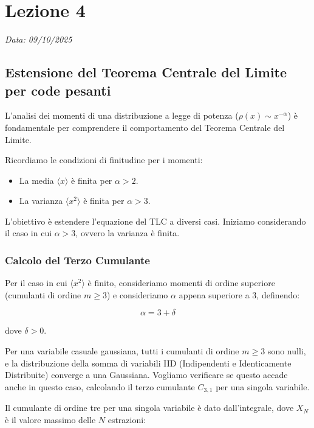 \chapter{Lezione 4}
\label{chap:lezione_04} 

\begin{flushright}
\textit{Data: 09/10/2025}
\end{flushright}


\section{Estensione del Teorema Centrale del Limite per code pesanti }

L'analisi dei momenti di una distribuzione a legge di potenza ($\rho(x) \sim x^{-\alpha}$) è fondamentale per comprendere il comportamento del Teorema Centrale del Limite.

Ricordiamo le condizioni di finitudine per i momenti:
\begin{itemize}
    \item La media $\langle x \rangle$ è finita per $\alpha > 2$.
    \item La varianza $\langle x^2 \rangle$ è finita per $\alpha > 3$.
\end{itemize}

L'obiettivo è estendere l'equazione del TLC a diversi casi. Iniziamo considerando il caso in cui $\alpha > 3$, ovvero la varianza è finita.

\subsection{Calcolo del Terzo Cumulante}

Per il caso in cui $\langle x^2 \rangle$ è finito, consideriamo momenti di ordine superiore (cumulanti di ordine $m \ge 3$) e consideriamo $\alpha$ appena superiore a 3, definendo:

\begin{equation}
\alpha = 3 + \delta
\end{equation}

dove $\delta > 0$.

Per una variabile casuale gaussiana, tutti i cumulanti di ordine $m \ge 3$ sono nulli, e la distribuzione della somma di variabili IID (Indipendenti e Identicamente Distribuite) converge a una Gaussiana. Vogliamo verificare se questo accade anche in questo caso, calcolando il terzo cumulante $C_{3,1}$ per una singola variabile.

Il cumulante di ordine tre per una singola variabile è dato dall'integrale, dove $X_N$ è il valore massimo delle $N$ estrazioni:

